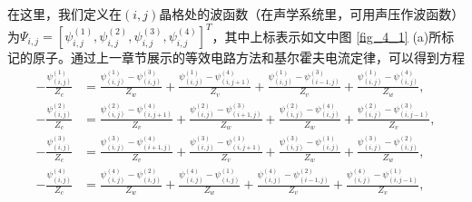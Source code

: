 在这里，我们定义在$(i,j)$晶格处的波函数（在声学系统里，可用声压作波函数）为$\Psi_{i,j} = [\psi_{i,j}^{(1)}, \psi_{i,j}^{(2)}, \psi_{i,j}^{(3)}, \psi_{i,j}^{(4)}]^T$，其中上标表示如文中图 \ref{fig_4_1} (a)所标记的原子。通过上一章节展示的等效电路方法和基尔霍夫电流定律，可以得到方程
\begin{equation}
    \begin{aligned}
    -\frac{\psi_{(i,j)}^{(1)}}{Z_c} &= \frac{\psi_{(i,j)}^{(1)} - \psi_{(i,j)}^{(3)}}{Z_w} + \frac{\psi_{(i,j)}^{(1)} - \psi_{(i,j + 1)}^{(4)}}{Z_v} + \frac{\psi_{(i,j)}^{(1)} - \psi_{(i - 1,j)}^{(3)}}{Z_v} + \frac{\psi_{(i,j)}^{(1)} - \psi_{(i,j)}^{(4)}}{Z_w}, \\
    -\frac{\psi_{(i,j)}^{(2)}}{Z_c} &= \frac{\psi_{(i,j)}^{(2)} - \psi_{(i,j + 1)}^{(4)}}{Z_v} + \frac{\psi_{(i,j)}^{(2)} - \psi_{(i + 1,j)}^{(3)}}{Z_w} + \frac{\psi_{(i,j)}^{(2)} - \psi_{(i,j)}^{(4)}}{Z_w} + \frac{\psi_{(i,j)}^{(2)} - \psi_{(i,j - 1)}^{(3)}}{Z_v}, \\
    -\frac{\psi_{(i,j)}^{(3)}}{Z_c} &= \frac{\psi_{(i,j)}^{(3)} - \psi_{(i + 1,j)}^{(4)}}{Z_v} + \frac{\psi_{(i,j)}^{(3)} - \psi_{(i,j + 1)}^{(1)}}{Z_v} + \frac{\psi_{(i,j)}^{(3)} - \psi_{(i,j)}^{(1)}}{Z_w} + \frac{\psi_{(i,j)}^{(3)} - \psi_{(i,j)}^{(2)}}{Z_w}, \\
    -\frac{\psi_{(i,j)}^{(4)}}{Z_c} &= \frac{\psi_{(i,j)}^{(4)} - \psi_{(i,j)}^{(2)}}{Z_w} + \frac{\psi_{(i,j)}^{(4)} - \psi_{(i,j)}^{(1)}}{Z_w} + \frac{\psi_{(i,j)}^{(4)} - \psi_{(i - 1,j)}^{(2)}}{Z_v} + \frac{\psi_{(i,j)}^{(4)} - \psi_{(i,j - 1)}^{(1)}}{Z_v},
    \end{aligned}
    \label{eq4-1}
\end{equation}

